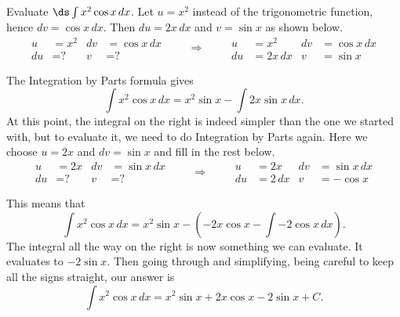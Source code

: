 \begin{example}\label{ex_ibp3}
Evaluate $\ds\int x^2\cos x \,dx$.
\solution
Let $u=x^2$ instead of the trigonometric function, hence $dv=\cos x\,dx$.  Then $du=2x\,dx$ and $v=\sin x$ as shown below.
\[
\begin{aligned}
u&= x^2 & dv&=\cos x\, dx\\
du&= \text{?} & v&=\text{?}
\end{aligned}
\qquad\Rightarrow\qquad
\begin{aligned}
u&= x^2 & dv&=\cos x\, dx\\
du&= 2x\, dx & v&=\sin x
\end{aligned}
\]

The Integration by Parts formula gives
\[\int x^2\cos x\,dx = x^2\sin x - \int 2x\sin x\,dx.\]
At this point, the integral on the right is indeed simpler than the one we started with, but to evaluate it, we need to do Integration by Parts again. Here we choose $u=2x$ and $dv=\sin x$ and fill in the rest below.
\[
\begin{aligned}
u&= 2x & dv&=\sin x\, dx\\
du&= \text{?} & v&=\text{?}
\end{aligned}
\qquad\Rightarrow\qquad
\begin{aligned}
u&= 2x & dv&=\sin x\, dx\\
du&= 2\, dx & v&=-\cos x
\end{aligned}
\]

This means that
\[\int x^2\cos x\,dx = x^2\sin x - \left(-2x\cos x - \int -2\cos x\,dx\right).\]
The integral all the way on the right is now something we can evaluate.  It evaluates to $-2\sin{x}$.  Then going through and simplifying, being careful to keep all the signs straight, our answer is
\[\int x^2\cos x\, dx = x^2\sin x  + 2x\cos x - 2\sin x + C.\]
\end{example}

